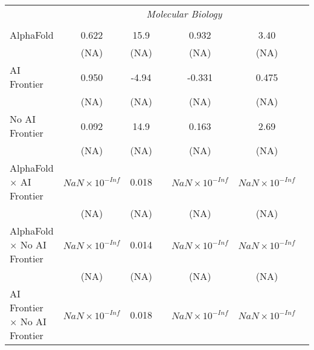 \begin{tabular}{lcccccc}
 & \multicolumn{6}{c}{\textit{Molecular Biology}} \\ \\
   AlphaFold                                                                  & 0.622                  & 15.9  &                        & 0.932                  & 3.40                   &   \\   
                                                                              & (NA)                   & (NA)  &                        & (NA)                   & (NA)                   &   \\   
   AI Frontier                                                                & 0.950                  & -4.94 &                        & -0.331                 & 0.475                  &   \\   
                                                                              & (NA)                   & (NA)  &                        & (NA)                   & (NA)                   &   \\   
   No AI Frontier                                                             & 0.092                  & 14.9  &                        & 0.163                  & 2.69                   &   \\   
                                                                              & (NA)                   & (NA)  &                        & (NA)                   & (NA)                   &   \\   
   AlphaFold $\times$ AI Frontier                                             & $NaN\times 10^{-Inf}$  & 0.018 &                        & $NaN\times 10^{-Inf}$  & $NaN\times 10^{-Inf}$  &   \\   
                                                                              & (NA)                   & (NA)  &                        & (NA)                   & (NA)                   &   \\   
   AlphaFold $\times$ No AI Frontier                                          & $NaN\times 10^{-Inf}$  & 0.014 &                        & $NaN\times 10^{-Inf}$  & $NaN\times 10^{-Inf}$  &   \\   
                                                                              & (NA)                   & (NA)  &                        & (NA)                   & (NA)                   &   \\   
   AI Frontier $\times$ No AI Frontier                                        & $NaN\times 10^{-Inf}$  & 0.018 &                        & $NaN\times 10^{-Inf}$  & $NaN\times 10^{-Inf}$  &   \\   

\end{tabular}
